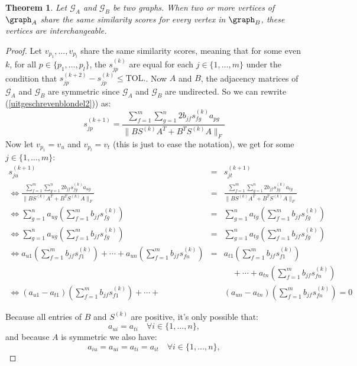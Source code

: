 \documentclass[a4paper,11pt]{report}
\newtheorem{theorem}{Theorem}[section]
\newcommand{\graf}{\mathscr{G}}
\begin{document}
\begin{itemize}
     \begin{theorem}
  Let $\graf_A$ and $\graf_B$ be two graphs. When two or more vertices of $\graph_A$ 
 share the same similarity scores for every vertex in $\graph_B$, these vertices 
  are interchangeable.
 \end{theorem}
 \begin{proof}
   Let $v_{p_1},\ldots,v_{p_l}$ share the same similarity scores, meaning that for some even $k$, 
   for all $p \in \{p_1,\ldots, p_l\}$, the $s^{(k)}_{jp}$ are equal for each $j \in \{1,\ldots,m\}$ under the condition
   that $s^{(k+2)}_{jp} - s^{(k)}_{jp} \leq \text{TOL}.$. Now $A$ and $B$, the 
   adjacency matrices of $\graf_A$ and $\graf_B$ are symmetric since $\graf_A$ 
   and $\graf_B$ are undirected. So we can rewrite (\ref{uitgeschrevenblondel2})) 
   as:
   $$s^{(k+1)}_{jp} = \frac{\sum^m_{f=1}\sum^n_{g=1} 2 b_{jf}s^{(k)}_{fg}a_{pg} }{\|BS^{(k)}A^T + B^TS^{(k)}A\|_F}$$
  Now let  $v_{p_1} = v_u$ and $v_p_l = v_t$ (this is just to ease the notation), we get for some $j \in \{1,\ldots,m\} $:
\allowdisplaybreaks  
\begin{eqnarray*}
    s^{(k+1)}_{ju} &=& s^{(k+1)}_{jt}\\
  \Leftrightarrow \frac{\sum^m_{f=1}\sum^n_{g=1} 2 b_{jf}s^{(k)}_{fg}a_{ug} }{\|BS^{(k)}A^T + B^TS^{(k)}A\|_F} 
      &=& \frac{\sum^m_{f=1}\sum^n_{g=1} 2 b_{jf}s^{(k)}_{fg}a_{tg} }{\|BS^{(k)}A^T + 
    B^TS^{(k)}A\|_F}\\
    \Leftrightarrow \sum^n_{g=1} a_{ug} \left(\sum^m_{f=1}b_{jf}s^{(k)}_{fg} \right) &=& 
    \sum^n_{g=1} a_{tg} \left(\sum^m_{f=1}b_{jf}s^{(k)}_{fg} \right) 
    \\
      \Leftrightarrow \sum^n_{g=1} a_{ug} \left(\sum^m_{f=1}b_{jf}s^{(k)}_{fg} \right) &=& 
    \sum^n_{g=1} a_{tg} \left(\sum^m_{f=1}b_{jf}s^{(k)}_{fg} \right)\\
    \Leftrightarrow a_{u1} \left(\sum^m_{f=1}b_{jf}s^{(k)}_{f1} \right) + \cdots +  a_{un} \left(\sum^m_{f=1}b_{jf}s^{(k)}_{fn} \right)
     &=&  a_{t1} \left(\sum^m_{f=1}b_{jf}s^{(k)}_{f1} \right) \\
     && \quad + \cdots +  a_{tn} \left(\sum^m_{f=1}b_{jf}s^{(k)}_{fn} \right) 
     \\
            \Leftrightarrow (a_{u1}-a_{t1})\left(\sum^m_{f=1}b_{jf}s^{(k)}_{f1} \right) + \cdots +  &&(a_{un}-a_{tn})\left(\sum^m_{f=1}b_{jf}s^{(k)}_{fn} \right) 
       =0
  \end{eqnarray*}

    Because all entries of $B$ and $S^{(k)}$ are positive, it's only possible
    that:
    $$a_{ui}=a_{ti} \quad \forall i \in \{1,\ldots,n\},$$
    and because $A$ is symmetric we also have:
   $$a_{iu} = a_{ui}=a_{ti} = a_{it} \quad \forall i \in \{1,\ldots,n\},$$


\end{proof}
\end{itemize}
\end{document}
